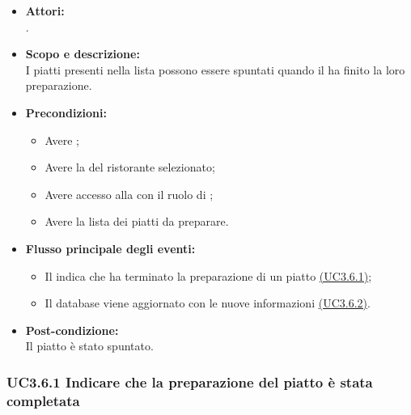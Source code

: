 \begin{itemize}
	\item \textbf{Attori:}
	\\.
	\item \textbf{Scopo e descrizione:} 
	\\I piatti presenti nella lista possono essere spuntati quando il  ha finito la loro preparazione.
	\item \textbf{Precondizioni:}
	\begin{itemize}
		\item Avere ;
		\item Avere la  del ristorante selezionato;
		\item Avere accesso alla  con il ruolo di ;
		\item Avere la lista dei piatti da preparare.
	\end{itemize}
	\item \textbf{Flusso principale degli eventi:}
	\begin{itemize}
		\item Il  indica che ha terminato la preparazione di un piatto \hyperref[UC3.6.1]{(UC3.6.1)};
		\item Il database viene aggiornato con le nuove informazioni \hyperref[UC3.6.2]{(UC3.6.2)}.
	\end{itemize}
	\item \textbf{Post-condizione:}
	\\Il piatto è stato spuntato.
\end{itemize}

\subsubsection{UC3.6.1 Indicare che la preparazione del piatto è stata completata} \label{UC3.6.1}

